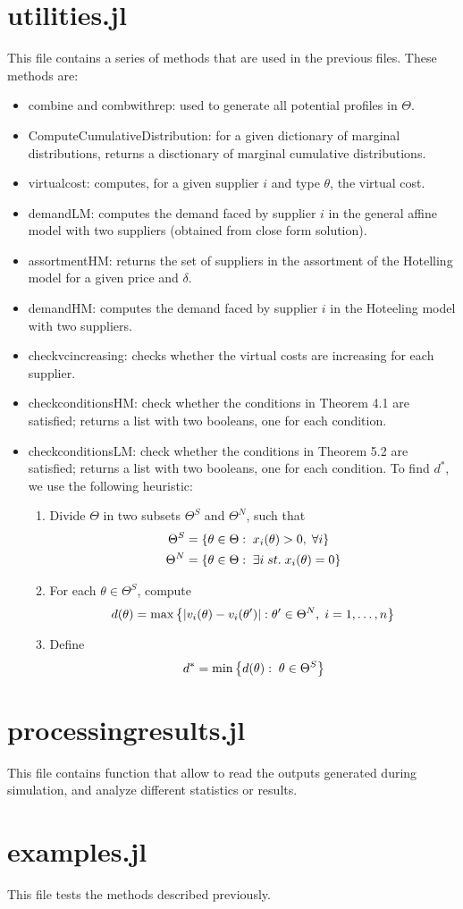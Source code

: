 \documentclass[11pt, oneside]{article}
\begin{document}
\section{utilities.jl}
This file contains a series of methods that are used in the previous files.
These methods are:
\begin{itemize}
    \item combine and combwithrep: used to generate all potential profiles in \(\Theta\).
    \item ComputeCumulativeDistribution: for a given dictionary of marginal
    distributions, returns a disctionary of marginal cumulative distributions.
    \item virtualcost: computes, for a given supplier \(i\) and type \(\theta\), the virtual cost.
    \item demandLM: computes the demand faced by supplier \(i\) in the general
    affine model with two suppliers (obtained from close form solution).
    \item assortmentHM: returns the set of suppliers in the assortment of the
    Hotelling model for a given price and \(\delta\).
    \item demandHM: computes the demand faced by supplier \(i\) in the
    Hoteeling model with two suppliers.
    \item checkvcincreasing: checks whether the virtual costs are increasing
    for each supplier.
    \item checkconditionsHM: check whether the conditions in Theorem 4.1 are
    satisfied; returns a list with two booleans, one for each condition.
    \item checkconditionsLM: check whether the conditions in Theorem 5.2 are
    satisfied; returns a list with two booleans, one for each condition. To
    find \(d^*\), we use the following heuristic:
    \begin{enumerate}
        \item Divide \(\Theta\) in two subsets \(\Theta^S\) and \(\Theta^N\),
        such that
        \[
        \begin{split}
        \Theta^S &= \left\{\theta \in \Theta: \; x_i(\theta) > 0, \; \forall i\right\} \\
        \Theta^N &= \left\{\theta \in \Theta: \; \exists i \; st.\;  x_i(\theta) = 0\right\}
        \end{split}
        \]
        \item For each \(\theta \in \Theta^S\), compute
        \[
        d(\theta) = \max\left\{\left|v_i(\theta)-v_i(\theta')\right|: \theta' \in \Theta^N, \; i=1, \ldots, n\right\}
        \]
        \item Define
        \[
        d^* = \min\left\{d(\theta):\; \theta\in \Theta^S\right\}
        \]
    \end{enumerate}

\end{itemize}

\section{processingresults.jl}
This file contains function that allow to read the outputs generated during simulation,
and analyze different statistics or results.

\section{examples.jl}
This file tests the methods described previously.
\end{document}
